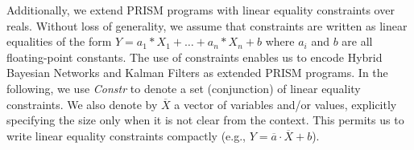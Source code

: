 Additionally, we extend PRISM programs with linear equality
constraints over reals.  Without loss of generality, we
assume that constraints are written as linear equalities of the form
$Y = a_1 * X_1 + \ldots + a_n * X_n + b$ where $a_i$ and $b$ are all
floating-point constants.
The use of constraints enables us to encode Hybrid Bayesian Networks and Kalman Filters as
extended PRISM programs.  In the following, we use \emph{Constr} to
denote a set (conjunction) of linear equality 
constraints.  We also denote by $\overline{X}$ a vector of variables
and/or values, explicitly specifying the size only when it is not
clear from the context.  This permits us to write linear equality
constraints compactly (e.g., $Y = \overline{a}\cdot\overline{X} +b$).



